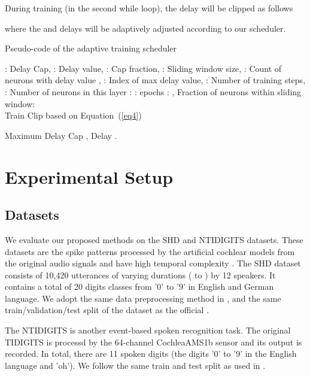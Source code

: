 \documentclass{article}
\begin{document}
During training (in the second while loop), the delay will be clipped as follows 

where the  and delays  will be adaptively adjusted according to our scheduler.
\begin{algorithm}[ht]
\renewcommand{\algorithmicrequire}{\textbf{Input:}}
	\renewcommand{\algorithmicensure}{\textbf{Output:}}
	\caption{Pseudo-code of the adaptive training scheduler}
	\label{alg1}
	\begin{algorithmic}[0]
	\REQUIRE : Delay Cap, : Delay value, : Cap fraction, : Sliding window size, : Count of neurons with delay value , : Index of max delay value, : Number of training steps, : Number of neurons in this layer
		:
	    :  epochs
	    : , 	
	    \STATE Fraction of neurons within sliding window:\\ 
	     
		\WHILE{{ }}
		\STATE 
		\STATE 
		\STATE 
		\WHILE{}
		\STATE Train 
     	\STATE Clip  based on Equation~(\ref{eq4})

	\STATE  	
		\ENDWHILE
		\ENDWHILE
		\ENSURE Maximum Delay Cap , Delay .
	\end{algorithmic}  
\end{algorithm}


\section{Experimental Setup}\label{3}
\subsection{Datasets}
We evaluate our proposed methods on the SHD \cite{cramer2020heidelberg} and NTIDIGITS \cite{anumula2018feature} datasets. These datasets are the spike patterns processed by the artificial cochlear models\cite{cramer2020heidelberg, anumula2018feature} from the original audio signals and have high temporal complexity \cite{iyer2021neuromorphic}. The SHD dataset consists of 10,420 utterances of varying durations ( to ) by  12 speakers. It contains a total of 20 digits classes from '0' to '9' in English and German language. We adopt the same data preprocessing method in \cite{yin2020effective}, and the same train/validation/test split of the dataset as the official \cite{cramer2020heidelberg}.


The NTIDIGITS is another event-based spoken recognition task. The original TIDIGITS is processd by the 64-channel CochleaAMS1b sensor and its output is recorded. In total, there are 11 spoken digits (the digits '0' to '9' in the English language and 'oh'). We follow the same train and test split as used in \cite{anumula2018feature}.
\iffalse
\begin{figure}
\centering
\texttt{[image: figure/input\_shd2.png]}
	\caption{An English spoken "2" example from SHD datasets. The Y-axis represents channels from 0 to 699 and X-axis represents time in  resolution.  }
\label{fig:example1}
\end{figure}
\fi
\end{document}
